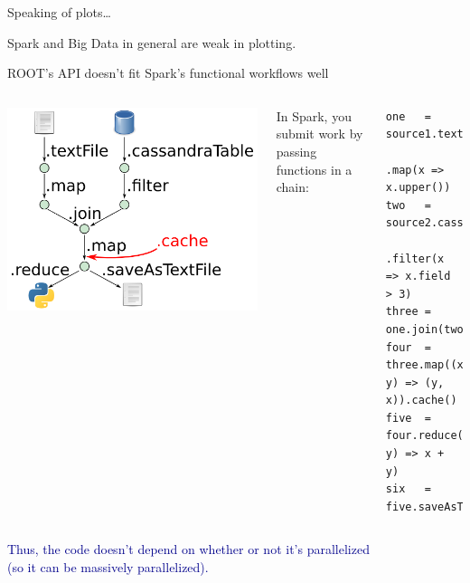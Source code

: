 \documentclass[aspectratio=169]{beamer}
\begin{document}
\begin{frame}{Speaking of plots\ldots}
\vspace{0.5 cm}
\begin{center}
\LARGE Spark and Big Data in general are weak in plotting.

\vspace{1 cm}

\vspace{1 cm}
\end{center}
\end{frame}

\begin{frame}[fragile]{ROOT's API doesn't fit Spark's functional workflows well}
\vspace{1 cm}
\begin{columns}
\includegraphics[width=\linewidth]{spark-dag.png}

In Spark, you submit work by passing functions in a chain:

\small
\begin{verbatim}
one   = source1.textFile("some.txt")
               .map(x => x.upper())
two   = source2.cassandraTable
               .filter(x => x.field > 3)
three = one.join(two)
four  = three.map((x, y) => (y, x)).cache()
five  = four.reduce((x, y) => x + y)
six   = five.saveAsTextFile("other.txt")
\end{verbatim}
\end{columns}

\vspace{0.5 cm}
\begin{center}
\textcolor{darkblue}{\large Thus, the code doesn't depend on whether or not it's parallelized \\ (so it can be massively parallelized).}
\end{center}
\end{frame}
\end{document}
